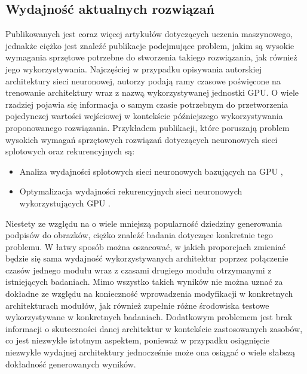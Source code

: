 \subsection{Wydajność aktualnych rozwiązań}
Publikowanych jest coraz więcej artykułów dotyczących uczenia maszynowego, jednakże ciężko jest znaleźć publikacje podejmujące problem, jakim są wysokie wymagania sprzętowe potrzebne do stworzenia takiego rozwiązania, jak również jego wykorzystywania. Najczęściej w przypadku opisywania autorskiej architektury sieci neuronowej, autorzy podają ramy czasowe poświęcone na trenowanie architektury wraz z nazwą wykorzystywanej jednostki GPU. O wiele rzadziej pojawia się informacja o samym czasie potrzebnym do przetworzenia pojedynczej wartości wejściowej w kontekście późniejszego wykorzystywania proponowanego rozwiązania.
Przykładem publikacji, które poruszają problem wysokich wymagań sprzętowych rozwiązań dotyczących neuronowych sieci splotowych oraz rekurencyjnych są:
\begin{itemize}
  \item Analiza wydajności splotowych sieci neuronowych bazujących na GPU \cite{cnn-compare},
  \item Optymalizacja wydajności rekurencyjnych sieci neuronowych wykorzystujących GPU \cite{rnn-compare}.
\end{itemize}
Niestety ze względu na o wiele mniejszą popularność dziedziny generowania podpisów do obrazków, ciężko znaleźć badania dotyczące konkretnie tego problemu. W łatwy sposób można oszacować, w jakich proporcjach zmieniać będzie się sama wydajność wykorzystywanych architektur poprzez połączenie czasów jednego modułu wraz z czasami drugiego modułu otrzymanymi z istniejących badaniach. Mimo wszystko takich wyników nie można uznać za dokładne ze względu na konieczność wprowadzenia modyfikacji w konkretnych architekturach modułów, jak również zupełnie różne środowiska testowe wykorzystywane w konkretnych badaniach. Dodatkowym problemem jest brak informacji o skuteczności danej architektur w kontekście zastosowanych zasobów, co jest niezwykle istotnym aspektem, ponieważ w przypadku osiągnięcie niezwykle wydajnej architektury jednocześnie może ona osiągać o wiele słabszą dokładność generowanych wyników.

